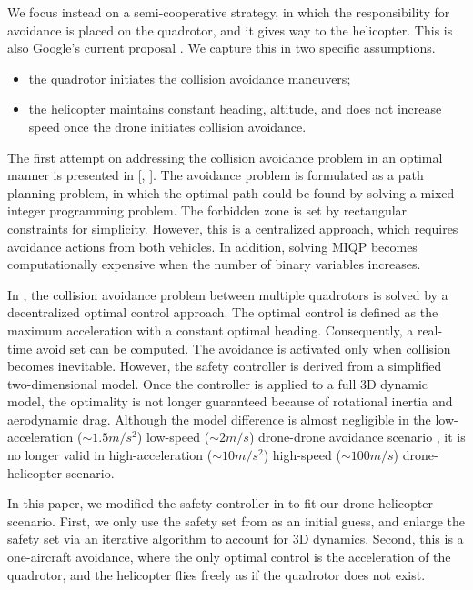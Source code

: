 \documentclass[journal,11pt,onecolumn,draftclsnofoot,]{IEEEtran}
\begin{document}
We focus instead on a semi-cooperative strategy, in which the responsibility for avoidance is placed on the quadrotor, and it gives way to the helicopter. This is also Google's current proposal \cite{google_airspace_system}. We capture this in two specific assumptions.

\begin{itemize}
	\item the quadrotor initiates the collision avoidance maneuvers;
	\item the helicopter maintains constant heading, altitude, and does not increase speed once the drone initiates collision avoidance.
\end{itemize}

The first attempt on addressing the collision avoidance problem in an optimal manner is presented in [, ]. The avoidance problem is formulated as a path planning problem, in which the optimal path could be found by solving a mixed integer programming problem. The forbidden zone is set by rectangular constraints for simplicity. However, this is a centralized approach, which requires avoidance actions from both vehicles. In addition, solving MIQP becomes computationally expensive when the number of binary variables increases.

In \cite{hoffmann2008decentralized}, the collision avoidance problem between multiple quadrotors is solved by a decentralized optimal control approach. The optimal control is defined as the maximum acceleration with a constant optimal heading. Consequently, a real-time avoid set can be computed. The avoidance is activated only when collision becomes inevitable. However, the safety controller is derived from a simplified two-dimensional model. Once the controller is applied to a full 3D dynamic model, the optimality is not longer guaranteed because of rotational inertia and aerodynamic drag. Although the model difference is almost negligible in the low-acceleration ($\sim 1.5m/s^2$) low-speed ($\sim 2 m/s$) drone-drone avoidance scenario \cite{hoffmann2008decentralized}, it is no longer valid in high-acceleration ($\sim 10m/s^2$) high-speed ($\sim 100 m/s$) drone-helicopter scenario. 

In this paper, we modified the safety controller in \cite{hoffmann2008decentralized} to fit our drone-helicopter scenario. First, we only use the safety set from \cite{hoffmann2008decentralized} as an initial guess, and enlarge the safety set via an iterative algorithm to account for 3D dynamics. Second, this is a one-aircraft avoidance, where the only optimal control is the acceleration of the quadrotor, and the helicopter flies freely as if the quadrotor does not exist. 
\end{document}
